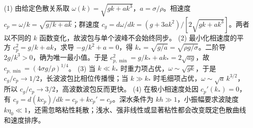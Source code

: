 (1) 由给定色散关系取 \(\omega(k)=\sqrt{gk+ak^3}\)，\(a=\sigma/\rho\)。相速度 \(c_p=\omega/k=\sqrt{g/k+ak}\)；群速度 \(c_g=d\omega/dk=(g+3ak^2)/[2\sqrt{gk+ak^3}]\)。两者以不同的 \(k\) 函数变化，故波包与单个波峰不会始终同步。
(2) 最小化相速度的平方 \(c_p^2=g/k+ak\)，求导 \(-g/k^2+a=0\)，得 \(k_*=\sqrt{g/a}=\sqrt{\rho g/\sigma}\)。二阶导 \(2g/k^3>0\)，确为唯一最小值。于是 \(c_{p,\min}^2=g/k_*+ak_*=2\sqrt{ag}\)，故 \(c_{p,\min}=(4\sigma g/\rho)^{1/4}\)。
(3) 当 \(k\ll k_*\) 时重力项占优，\(\omega\sim\sqrt{gk}\)，于是 \(c_g/c_p\to1/2\)，长波波包比相位传播慢；当 \(k\gg k_*\) 时毛细项占优，\(\omega\sim\sqrt a\,k^{3/2}\)，所以 \(c_g/c_p\to3/2\)，高波数波包反而更快。
(4) 在极小相速度处因 \(c_p'(k_*)=0\)，有 \(c_g=d(kc_p)/dk=c_p+kc_p'=c_p\)。深水条件为 \(kh\gg1\)，小振幅要求波陡度 \(k\eta_0\ll1\)，还需忽略粘性耗散；浅水、强非线性或显著粘性都会改变既定色散曲线和速度排序。
